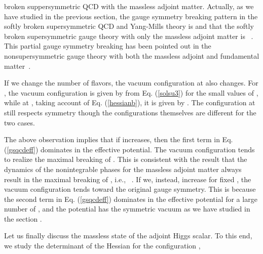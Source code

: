 \documentclass[a4paper,12pt]{article}
\begin{document}
broken suppersymmetric QCD with the massless adjoint matter. Actually, as we
have studied in the previous section, the gauge symmetry breaking pattern 
in the softly broken supersymmetric QCD and Yang-Mills 
theory is \coordHE{} and that the 
softly broken supersymmetric gauge theory with only the massless
adjoint matter is \coordHE{}~\cite{takenagab}. 
This partial gauge symmetry breaking has been pointed out in 
the nonsupersymmetric gauge theory with both the massless adjoint and 
fundamental matter~\cite{intf}.
\par
If we change the number of flavors, the vacuum configuration 
at \myHighlight{$\beta=\pi$}\coordHE{} also changes. For \coordHE{}, the 
vacuum configuration is given by \coordHE{} 
from Eq. (\ref{solsu3}) for the small values of \myHighlight{$\beta$}\coordHE{}, while
at \myHighlight{$\beta=\pi$}\coordHE{}, taking account of Eq. (\ref{hessianb}), it is
given by \coordHE{}. The configuration
at \myHighlight{$\beta=\pi$}\coordHE{} still 
respects \coordHE{} symmetry though the configurations themselves
are different for the two cases.
\par
The above observation implies that if \coordHE{} increases, then the 
first term in Eq. (\ref{gsqcdeff}) dominates in the effective potential. 
The vacuum configuration
tends to realize the maximal breaking of \coordHE{}. This is consistent with
the result that the dynamics of the nonintegrable phases
for the massless adjoint matter always result in the maximal breaking of 
\coordHE{}, i.e., \coordHE{}~\cite{takenagab}. If we, instead, increase 
\coordHE{} for fixed \coordHE{}, the vacuum configuration tends toward 
the original gauge symmetry. 
This is because the second term in Eq. (\ref{gsqcdeff})  
dominates in the effective potential for a large number of \coordHE{}, and 
the potential has the \coordHE{} symmetric vacuum as we have studied in the
section \coordHE{}.
\par
Let us finally discuss the massless state of 
the adjoint Higgs scalar. To this end, we study
the determinant of the Hessian for the 
configuration \coordHE{},
\end{document}
